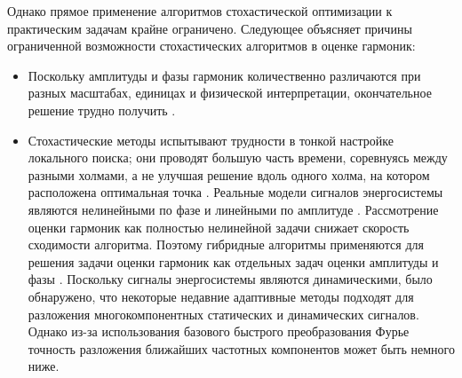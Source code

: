 
Однако прямое применение алгоритмов стохастической оптимизации к практическим задачам крайне ограничено. Следующее объясняет причины ограниченной возможности стохастических алгоритмов в оценке гармоник:
\begin{itemize}
\item Поскольку амплитуды и фазы гармоник количественно различаются при разных масштабах, единицах и физической интерпретации, окончательное решение трудно получить \cite{4469961}.

\item Стохастические методы испытывают трудности в тонкой настройке локального поиска; они проводят большую часть времени, соревнуясь между разными холмами, а не улучшая решение вдоль одного холма, на котором расположена оптимальная точка \cite{singh2016power}. Реальные модели сигналов энергосистемы являются нелинейными по фазе и линейными по амплитуде \cite{dash1998fast, singh2016several, 1413428, ray2012ensemble, dash1996harmonic, singh2016several}. Рассмотрение оценки гармоник как полностью нелинейной задачи снижает скорость сходимости алгоритма. Поэтому гибридные алгоритмы применяются для решения задачи оценки гармоник как отдельных задач оценки амплитуды и фазы \cite{joorabian2009harmonic, moravej2014hybrid, 1193852, 4469961, singh2016power, 6202692б, 6419813, nanda2016new}. Поскольку сигналы энергосистемы являются динамическими, было обнаружено, что некоторые недавние адаптивные методы \cite{6522142, 6908042} подходят для разложения многокомпонентных статических и динамических сигналов. Однако из-за использования базового быстрого преобразования Фурье точность разложения ближайших частотных компонентов может быть немного ниже.
\end{itemize}

